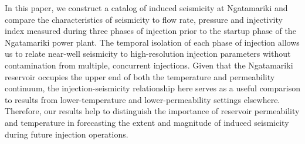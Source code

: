 In this paper, we construct a catalog of induced seismicity at Ngatamariki and compare the characteristics of seismicity to flow rate, pressure and injectivity index measured during three phases of injection prior to the startup phase of the Ngatamariki power plant. The temporal isolation of each phase of injection allows us to relate near-well seismicity to high-resolution injection parameters without contamination from multiple, concurrent injections. Given that the Ngatamariki reservoir occupies the upper end of both the temperature and permeability continuum, the injection-seismicity relationship here serves as a useful comparison to results from lower-temperature and lower-permeability settings elsewhere. Therefore, our results help to distinguish the importance of reservoir permeability and temperature in forecasting the extent and magnitude of induced seismicity during future injection operations.

